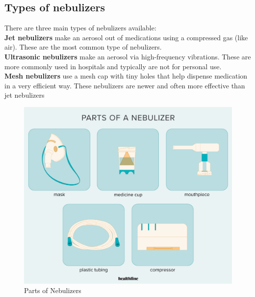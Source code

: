 \documentclass[12pt]{article}
\begin{document}
\subsection{Types of nebulizers}
There are three main types of nebulizers available:\\
\textbf{Jet nebulizers} make an aerosol out of medications using a compressed gas (like air). These are the most common type of nebulizers.\\
\textbf{Ultrasonic nebulizers} make an aerosol via high-frequency vibrations. These are more commonly used in hospitals and typically are not for personal use.\\
\textbf{Mesh nebulizers} use a mesh cap with tiny holes that help dispense medication in a very efficient way. These nebulizers are newer and often more effective than jet nebulizers\\
\begin{figure}[h]
\centering
\includegraphics[scale=0.1]{type.jpg}
\caption{Parts of Nebulizers}
\end{figure}


\end{document}
